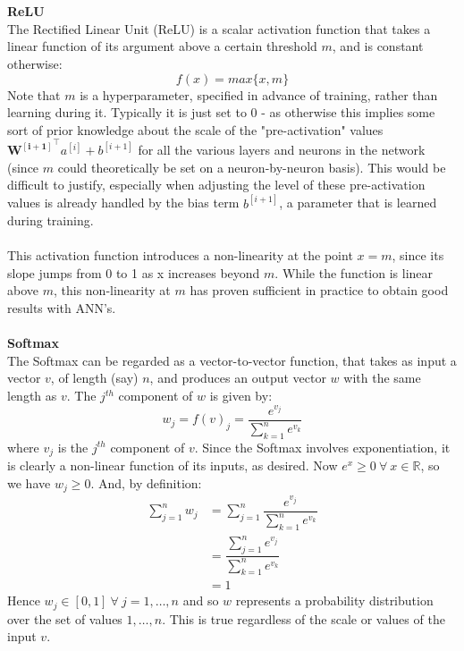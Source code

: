 \documentclass[11pt]{article} %
\theoremstyle{plain}
\theoremstyle{definition}
\begin{document}
\\
\\
\noindent
\textbf{ReLU}
\\
\noindent
The Rectified Linear Unit (ReLU) is a scalar activation function that takes a linear function of its argument above a certain threshold \(m\), and is constant otherwise:
\[f(x) = max\{x,m\} \] 
Note that \(m\) is a hyperparameter, specified in advance of training, rather than learning during it. Typically it is just set to 0 - as otherwise this implies some sort of prior knowledge about the scale of the "pre-activation" values \(\mathbf{{W^{[i+1]}}^{\top}}a^{[i]} + b^{[i+1]} \) for all the various layers and neurons in the network (since \(m\) could theoretically be set on a neuron-by-neuron basis). This would be difficult to justify, especially when adjusting the level of these pre-activation values is already handled by the bias term \(b^{[i+1]}\), a parameter that is learned during training.  
\\
\\
\noindent
This activation function introduces a non-linearity at the point \(x=m\), since its slope jumps from 0 to 1 as x increases beyond \(m\). While the function is linear above \(m\), this non-linearity at \(m\) has proven sufficient in practice to obtain good results with ANN's.
\\
\\
\noindent
\textbf{Softmax}
\\
\noindent
The Softmax can be regarded as a vector-to-vector function, that takes as input a vector \(v\), of length (say) \(n\), and produces an output vector \(w\) with the same length as \(v\). The \(j^{th}\) component of \(w\) is given by:
\[w_j = f(v)_j = \dfrac{e^{v_j}}{\sum_{k=1}^n e^{v_k}} \] 
where \(v_j\) is the \(j^{th}\) component of \(v\). Since the Softmax involves exponentiation, it is clearly a non-linear function of its inputs, as desired. Now \({e^x}\geq0 \ \forall \ x \in \mathbb{R} \), so we have \(w_j\geq0\). And, by definition:
\begin{align*}
\sum_{j=1}^n w_j &= \sum_{j=1}^n \dfrac{e^{v_j}}{\sum_{k=1}^n e^{v_k}} \\
&= \dfrac{\sum_{j=1}^n e^{v_j}}{\sum_{k=1}^n e^{v_k}} \\
&= 1 
\end{align*}
Hence \(w_j \in [0,1] \ \forall \ j=1, \ldots,n\) and so \(w\) represents a probability distribution over the set of values \(1, \ldots,n\). This is true regardless of the scale or values of the input \(v\).  
\\
\end{document}
